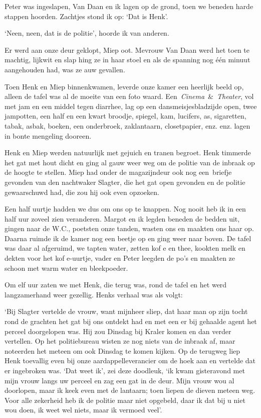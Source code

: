 \documentclass{book}
\begin{document}
Peter was ingeslapen, Van Daan en ik lagen op de grond, toen we beneden
harde stappen hoorden. Zachtjes stond ik op: `Dat is Henk'.

`Neen, neen, dat is de politie', hoorde ik van anderen.

Er werd aan onze deur geklopt, Miep oot. Mevrouw Van Daan werd het toen
te machtig, lijkwit en slap hing ze in haar stoel en als de spanning nog
één minuut aangehouden had, was ze auw gevallen.

Toen Henk en Miep binnenkwamen, leverde onze kamer een heerlijk beeld
op, alleen de tafel was al de moeite van een foto waard.
Een~\emph{Cinema}~\&~\emph{Theater}, vol met jam en een middel tegen
diarrhee, lag op een dansmeisjesbladzijde open, twee jampotten, een half
en een kwart broodje, spiegel, kam, lucifers, as, sigaretten, tabak,
asbak, boeken, een onderbroek, zaklantaarn, closetpapier, enz. enz.
lagen in bonte mengeling dooreen.

Henk en Miep werden natuurlijk met gejuich en tranen begroet. Henk
timmerde het gat met hout dicht en ging al gauw weer weg om de politie
van de inbraak op de hoogte te stellen. Miep had onder de magazijndeur
ook nog een~briefje gevonden van den nachtwaker Slagter, die het gat
open gevonden en de politie gewaarschuwd had, die zou hij ook even
opzoeken.

Een half uurtje hadden we dus om ons op te knappen. Nog nooit heb ik in
een half uur zoveel zien veranderen. Margot en ik legden beneden de
bedden uit, gingen naar de W.C., poetsten onze tanden, wasten ons en
maakten ons haar op. Daarna ruimde ik de kamer nog een beetje op en ging
weer naar boven. De tafel was daar al afgeruimd, we tapten water, zetten
kof e en thee, kookten melk en dekten voor het kof e-uurtje, vader en
Peter leegden de po's en maakten ze schoon met warm water en
bleekpoeder.

Om elf uur zaten we met Henk, die terug was, rond de tafel en het werd
langzamerhand weer gezellig. Henks verhaal was als volgt:

`Bij Slagter vertelde de vrouw, want mijnheer sliep, dat haar man op
zijn tocht rond de grachten het gat bij ons ontdekt had en met een er
bij gehaalde agent het perceel doorgelopen was. Hij zou Dinsdag bij
Kraler komen en dan verder vertellen. Op het politiebureau wisten ze nog
niets van de inbraak af, maar noteerden het meteen om ook Dinsdag te
komen kijken. Op de terugweg liep Henk toevallig even bij onze
aardappelleverancier om de hoek aan en vertelde dat er ingebroken was.
`Dat weet ik', zei deze doodleuk, `ik kwam gisteravond met mijn vrouw
langs uw perceel en zag een gat in de deur. Mijn vrouw wou al doorlopen,
maar ik keek even met de lantaarn; toen liepen de dieven meteen weg.
Voor alle zekerheid heb ik de politie maar niet opgebeld, daar ik dat
bij u niet wou doen, ik weet wel niets, maar ik vermoed veel'.
\end{document}

